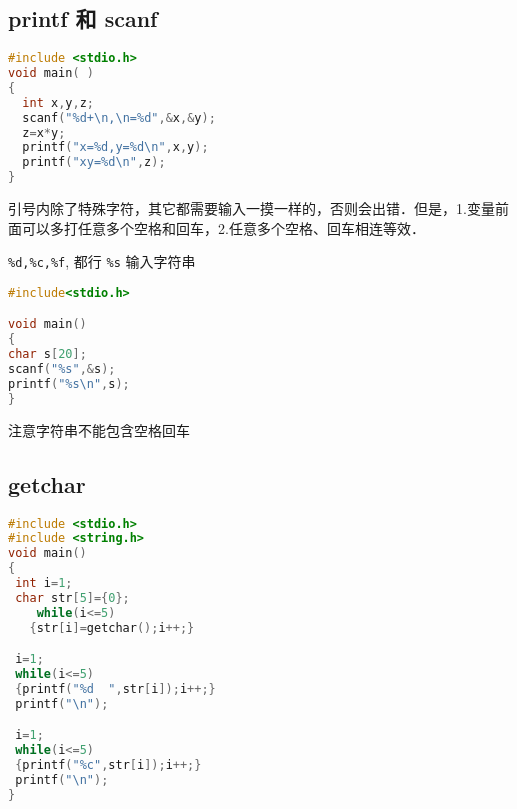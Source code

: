 
\begin{issues}
\issueDraft
\end{issues}


\subsection{printf 和 scanf}
\begin{lstlisting}[language=cpp]
#include <stdio.h>
void main( )
{
  int x,y,z;
  scanf("%d+\n,\n=%d",&x,&y);
  z=x*y;
  printf("x=%d,y=%d\n",x,y);
  printf("xy=%d\n",z);
}
\end{lstlisting}
引号内除了特殊字符，其它都需要输入一摸一样的，否则会出错．但是，1.变量前面可以多打任意多个空格和回车，2.任意多个空格、回车相连等效．
 
\verb|%d,%c,%f|, 都行 \verb|%s| 输入字符串
\begin{lstlisting}[language=cpp]
#include<stdio.h>

void main()
{
char s[20];
scanf("%s",&s);
printf("%s\n",s);
}
\end{lstlisting}
注意字符串不能包含空格回车

\subsection{getchar}
\begin{lstlisting}[language=cpp]
#include <stdio.h>
#include <string.h>
void main()
{
 int i=1;
 char str[5]={0};
    while(i<=5)
   {str[i]=getchar();i++;}

 i=1;
 while(i<=5)
 {printf("%d  ",str[i]);i++;}
 printf("\n");

 i=1;
 while(i<=5)
 {printf("%c",str[i]);i++;}
 printf("\n");
}
\end{lstlisting}
